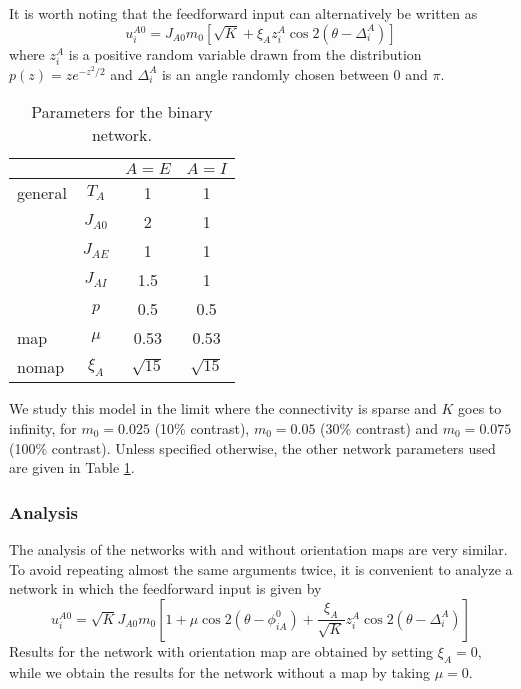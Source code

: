 It is worth noting that the feedforward input 
can alternatively be written as
\begin{equation}
u_i^{A0}=J_{A0}m_0\left[\sqrt{K}+
\xi_A z_i^A\cos 2(\theta-\Delta_i^A)\right]
\end{equation}
where $z_i^A$ is a positive random variable drawn from the distribution 
$p(z)=ze^{-z^2/2}$ and $\Delta_i^A$ is an angle randomly chosen between 0 and 
$\pi$\@. 

\begin{table}
\begin{center}
\begin{tabular}{|l|c|c|c|}
\hline
 & & $A=E$ & $A=I$ \\ 
\hline
general & $T_A$ & 1 & 1 \\
 & $J_{A0}$ & 2 & 1 \\
 & $J_{AE}$ & 1 & 1 \\
 & $J_{AI}$ & 1.5 & 1 \\
 & $p$ & 0.5 & 0.5 \\
\hline
map & $\mu$ & 0.53 & 0.53 \\
\hline
nomap & $\xi_A$ & $\sqrt{15}$ & $\sqrt{15}$ \\
\hline
\end{tabular}
\end{center}
\caption{Parameters for the binary network.}
\label{bin-param:tab}
\end{table}

We study this model in the limit where the connectivity is sparse and $K$ goes 
to infinity, for $m_0=0.025$ (10\% contrast), $m_0=0.05$ (30\% contrast) 
and $m_0=0.075$ (100\% contrast). Unless specified otherwise, the other 
network parameters used are given in Table \ref{bin-param:tab}.

\subsubsection*{Analysis}

The analysis of the networks with and without orientation maps are very similar.
To avoid repeating almost the same arguments twice, it is convenient to 
analyze a network in which the feedforward input is given by 
\begin{equation}
u_i^{A0} = \sqrt{K}J_{A0}m_0\left[1+\mu\cos 2(\theta-\phi_{iA}^0)+
\frac{\xi_A}{\sqrt{K}}z_i^A\cos 2(\theta-\Delta_i^A)\right]
\end{equation}
Results for the network with orientation map are obtained by setting $\xi_A=0$,
while we obtain the results for the network without a map by taking $\mu=0$.


